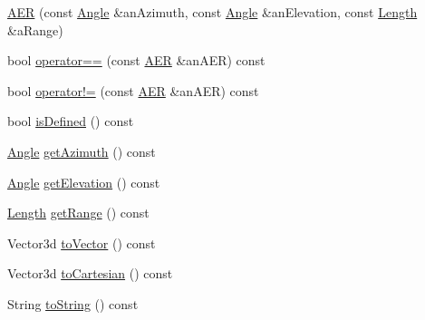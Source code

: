 \begin{DoxyCompactItemize}
\item 
\hyperlink{classlibrary_1_1physics_1_1coord_1_1spherical_1_1_a_e_r_a40e444abec38e14d0e592d6d0dd92829}{A\+ER} (const \hyperlink{classlibrary_1_1physics_1_1units_1_1_angle}{Angle} \&an\+Azimuth, const \hyperlink{classlibrary_1_1physics_1_1units_1_1_angle}{Angle} \&an\+Elevation, const \hyperlink{classlibrary_1_1physics_1_1units_1_1_length}{Length} \&a\+Range)
\item 
bool \hyperlink{classlibrary_1_1physics_1_1coord_1_1spherical_1_1_a_e_r_a5cfe02e32fc014a50c6b8146fb5e72cf}{operator==} (const \hyperlink{classlibrary_1_1physics_1_1coord_1_1spherical_1_1_a_e_r}{A\+ER} \&an\+A\+ER) const
\item 
bool \hyperlink{classlibrary_1_1physics_1_1coord_1_1spherical_1_1_a_e_r_a8457375a42b7dd2626ea56565b9954f2}{operator!=} (const \hyperlink{classlibrary_1_1physics_1_1coord_1_1spherical_1_1_a_e_r}{A\+ER} \&an\+A\+ER) const
\item 
bool \hyperlink{classlibrary_1_1physics_1_1coord_1_1spherical_1_1_a_e_r_a28b51d480125b504493b5302ff4370f1}{is\+Defined} () const
\item 
\hyperlink{classlibrary_1_1physics_1_1units_1_1_angle}{Angle} \hyperlink{classlibrary_1_1physics_1_1coord_1_1spherical_1_1_a_e_r_aa964345a33f331705fd2ae734c8372ee}{get\+Azimuth} () const
\item 
\hyperlink{classlibrary_1_1physics_1_1units_1_1_angle}{Angle} \hyperlink{classlibrary_1_1physics_1_1coord_1_1spherical_1_1_a_e_r_a24592fe1b6c8c5c70df073e321614973}{get\+Elevation} () const
\item 
\hyperlink{classlibrary_1_1physics_1_1units_1_1_length}{Length} \hyperlink{classlibrary_1_1physics_1_1coord_1_1spherical_1_1_a_e_r_a38f3110706a1b3b438cbb5489e2d692f}{get\+Range} () const
\item 
Vector3d \hyperlink{classlibrary_1_1physics_1_1coord_1_1spherical_1_1_a_e_r_a008508f871965061743e98e6e2e108e8}{to\+Vector} () const
\item 
Vector3d \hyperlink{classlibrary_1_1physics_1_1coord_1_1spherical_1_1_a_e_r_ae18eaf2913d2ce9c66b412b8aeebd517}{to\+Cartesian} () const
\item 
String \hyperlink{classlibrary_1_1physics_1_1coord_1_1spherical_1_1_a_e_r_ac6d9d6192880443b933ff21047834c52}{to\+String} () const
\end{DoxyCompactItemize}
